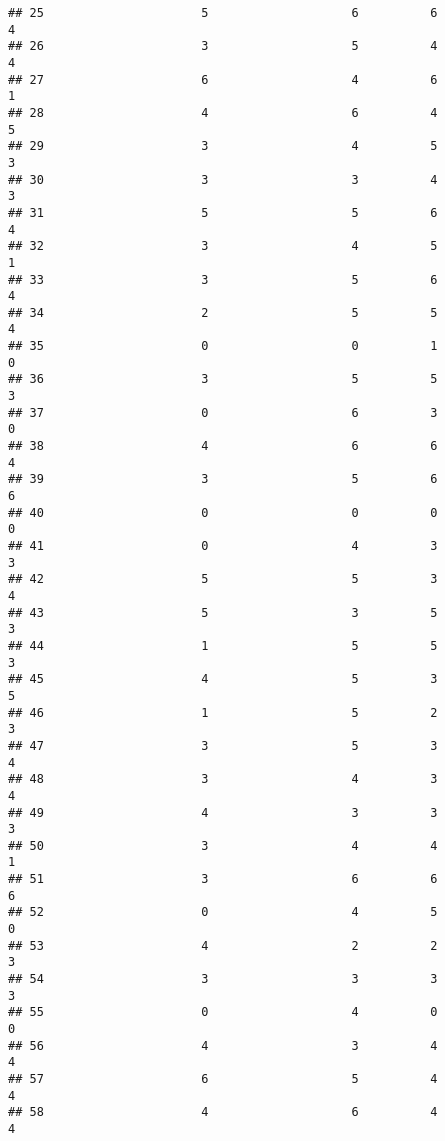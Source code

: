 \documentclass[
]{article}
\begin{document}
\begin{verbatim}
## 25                      5                    6          6               4
## 26                      3                    5          4               4
## 27                      6                    4          6               1
## 28                      4                    6          4               5
## 29                      3                    4          5               3
## 30                      3                    3          4               3
## 31                      5                    5          6               4
## 32                      3                    4          5               1
## 33                      3                    5          6               4
## 34                      2                    5          5               4
## 35                      0                    0          1               0
## 36                      3                    5          5               3
## 37                      0                    6          3               0
## 38                      4                    6          6               4
## 39                      3                    5          6               6
## 40                      0                    0          0               0
## 41                      0                    4          3               3
## 42                      5                    5          3               4
## 43                      5                    3          5               3
## 44                      1                    5          5               3
## 45                      4                    5          3               5
## 46                      1                    5          2               3
## 47                      3                    5          3               4
## 48                      3                    4          3               4
## 49                      4                    3          3               3
## 50                      3                    4          4               1
## 51                      3                    6          6               6
## 52                      0                    4          5               0
## 53                      4                    2          2               3
## 54                      3                    3          3               3
## 55                      0                    4          0               0
## 56                      4                    3          4               4
## 57                      6                    5          4               4
## 58                      4                    6          4               4

\end{verbatim}
\end{document}
